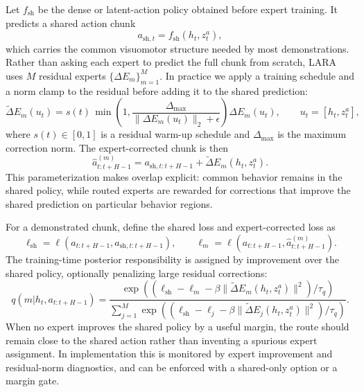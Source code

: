 \documentclass[10pt]{article}
\begin{document}
Let $f_{\mathrm{sh}}$ be the dense or latent-action policy obtained before expert
training. It predicts a shared action chunk
\begin{equation}
 a_{\mathrm{sh},t}=f_{\mathrm{sh}}(h_t,z_t^a),
\end{equation}
which carries the common visuomotor structure needed by most demonstrations.
Rather than asking each expert to predict the full chunk from scratch, LARA
uses $M$ residual experts $\{\Delta E_m\}_{m=1}^M$. In practice we apply a
training schedule and a norm clamp to the residual before adding it to the
shared prediction:
\begin{equation}
 \tilde{\Delta}E_m(u_t)
 = s(t)\,
 \min\left(1,\frac{\Delta_{\max}}{\|\Delta E_m(u_t)\|_2+\epsilon}\right)
 \Delta E_m(u_t),
 \qquad u_t=[h_t,z_t^a],
 \label{eq:residual_clamp}
\end{equation}
where $s(t)\in[0,1]$ is a residual warm-up schedule and $\Delta_{\max}$ is the
maximum correction norm. The expert-corrected chunk is then
\begin{equation}
 \hat{a}^{(m)}_{t:t+H-1}
 = a_{\mathrm{sh},t:t+H-1}+\tilde{\Delta}E_m(h_t,z_t^a).
 \label{eq:residual_expert}
\end{equation}
This parameterization makes overlap explicit: common behavior remains in the
shared policy, while routed experts are rewarded for corrections that improve
the shared prediction on particular behavior regions.

For a demonstrated chunk, define the shared loss and expert-corrected loss as
\begin{equation}
 \ell_{\mathrm{sh}}=\ell(a_{t:t+H-1},a_{\mathrm{sh},t:t+H-1}),\qquad
 \ell_m=\ell(a_{t:t+H-1},\hat{a}^{(m)}_{t:t+H-1}).
\end{equation}
The training-time posterior responsibility is assigned by improvement over the
shared policy, optionally penalizing large residual corrections:
\begin{equation}
 q(m|h_t,a_{t:t+H-1}) =
 \frac{\exp\left((\ell_{\mathrm{sh}}-\ell_m-\beta\|\tilde{\Delta}E_m(h_t,z_t^a)\|^2)/\tau_q\right)}
 {\sum_{j=1}^{M}\exp\left((\ell_{\mathrm{sh}}-\ell_j-\beta\|\tilde{\Delta}E_j(h_t,z_t^a)\|^2)/\tau_q\right)}.
 \label{eq:responsibility}
\end{equation}
When no expert improves the shared policy by a useful margin, the route should
remain close to the shared action rather than inventing a spurious expert
assignment. In implementation this is monitored by expert improvement and
residual-norm diagnostics, and can be enforced with a shared-only option or a
margin gate.
\end{document}
